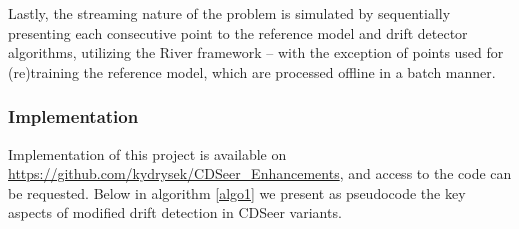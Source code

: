 \documentclass{svproc}
\begin{document}
Lastly, the streaming nature of the problem is simulated by sequentially presenting each consecutive point to the reference model and drift detector algorithms, utilizing the  River framework – with the exception of points used for (re)training the reference model, which are processed offline in a batch manner.

\subsubsection{Implementation}

Implementation of this project is available on \url{https://github.com/kydrysek/CDSeer_Enhancements}, and access to the code can be requested. 
Below in algorithm \ref{algo1} we present as pseudocode the key aspects of modified drift detection in CDSeer variants.
\end{document}
